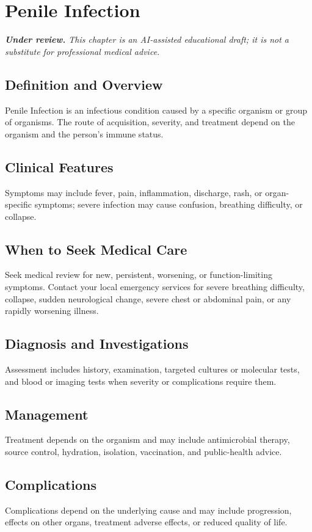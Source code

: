 \chapter{Penile Infection}

\medskip
\noindent\textit{\textbf{Under review.} This chapter is an AI-assisted educational draft; it is not a substitute for professional medical advice.}

\section*{Definition and Overview}
Penile Infection is an infectious condition caused by a specific organism or group of organisms. The route of acquisition, severity, and treatment depend on the organism and the person's immune status.

\section*{Clinical Features}
Symptoms may include fever, pain, inflammation, discharge, rash, or organ-specific symptoms; severe infection may cause confusion, breathing difficulty, or collapse.

\section*{When to Seek Medical Care}
Seek medical review for new, persistent, worsening, or function-limiting symptoms. Contact your local emergency services for severe breathing difficulty, collapse, sudden neurological change, severe chest or abdominal pain, or any rapidly worsening illness.

\section*{Diagnosis and Investigations}
Assessment includes history, examination, targeted cultures or molecular tests, and blood or imaging tests when severity or complications require them.

\section*{Management}
Treatment depends on the organism and may include antimicrobial therapy, source control, hydration, isolation, vaccination, and public-health advice.

\section*{Complications}
Complications depend on the underlying cause and may include progression, effects on other organs, treatment adverse effects, or reduced quality of life.

